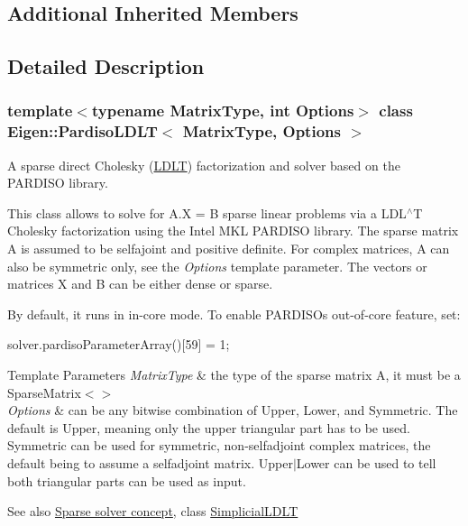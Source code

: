 \subsection*{Additional Inherited Members}


\subsection{Detailed Description}
\subsubsection*{template$<$typename Matrix\+Type, int Options$>$\newline
class Eigen\+::\+Pardiso\+L\+D\+L\+T$<$ Matrix\+Type, Options $>$}

A sparse direct Cholesky (\hyperlink{group___cholesky___module_class_eigen_1_1_l_d_l_t}{L\+D\+LT}) factorization and solver based on the P\+A\+R\+D\+I\+SO library. 

This class allows to solve for A.\+X = B sparse linear problems via a L\+D\+L$^\wedge$T Cholesky factorization using the Intel M\+KL P\+A\+R\+D\+I\+SO library. The sparse matrix A is assumed to be selfajoint and positive definite. For complex matrices, A can also be symmetric only, see the {\itshape Options} template parameter. The vectors or matrices X and B can be either dense or sparse.

By default, it runs in in-\/core mode. To enable P\+A\+R\+D\+I\+SO\textquotesingle{}s out-\/of-\/core feature, set\+: 
\begin{DoxyCode}
solver.pardisoParameterArray()[59] = 1; 
\end{DoxyCode}



\begin{DoxyTemplParams}{Template Parameters}
{\em Matrix\+Type} & the type of the sparse matrix A, it must be a Sparse\+Matrix$<$$>$ \\
\hline
{\em Options} & can be any bitwise combination of Upper, Lower, and Symmetric. The default is Upper, meaning only the upper triangular part has to be used. Symmetric can be used for symmetric, non-\/selfadjoint complex matrices, the default being to assume a selfadjoint matrix. Upper$\vert$\+Lower can be used to tell both triangular parts can be used as input.\\
\hline
\end{DoxyTemplParams}


\begin{DoxySeeAlso}{See also}
\hyperlink{SparseLinearSystems.dox_TutorialSparseSolverConcept}{Sparse solver concept}, class \hyperlink{group___sparse_cholesky___module_class_eigen_1_1_simplicial_l_d_l_t}{Simplicial\+L\+D\+LT} 
\end{DoxySeeAlso}


